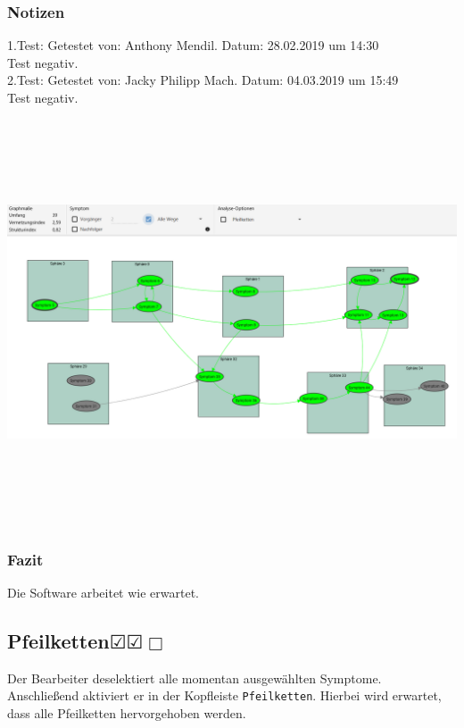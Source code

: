 \documentclass[enabledeprecatedfontcommands]{scrartcl}
\newcommand{\subsectiont}[2]{\subsection[#1]{#1{\normalsize\normalfont #2}}}
\newcommand{\leer}{$\Box$}
\newcommand{\ok}{$\CheckedBox$}
\begin{document}
\subsubsection{Notizen}
1.Test: Getestet von: Anthony Mendil. Datum: 28.02.2019 um 14:30 \\
Test negativ. \\
2.Test: Getestet von: Jacky Philipp Mach. Datum: 04.03.2019 um 15:49 \\
Test negativ.
\begin{center}
\includegraphics[height=12cm, angle=90]{analysealleWege.PNG}
\end{center}
\subsubsection{Fazit}
Die Software arbeitet wie erwartet.

\subsectiont{Pfeilketten}{\dotfill\ok\ok\leer}
Der Bearbeiter deselektiert alle momentan ausgewählten Symptome. Anschließend aktiviert er in der Kopfleiste \texttt{Pfeilketten}. Hierbei wird erwartet, dass alle Pfeilketten hervorgehoben werden. 
\end{document}
